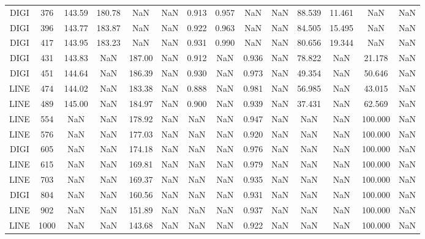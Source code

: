 \begin{table}[h]
\begin{tabular}{cccccccccccccc}
		\rowcolor[HTML]{EFEFEF} 
		DIGI & 376    & 143.59 & 180.78 & NaN    & NaN    & 0.913 & 0.957 & NaN   & NaN   & 88.539 & 11.461 & NaN     & NaN     \\
		DIGI & 396    & 143.77 & 183.87 & NaN    & NaN    & 0.922 & 0.963 & NaN   & NaN   & 84.505 & 15.495 & NaN     & NaN     \\
		\rowcolor[HTML]{EFEFEF} 
		DIGI & 417    & 143.95 & 183.23 & NaN    & NaN    & 0.931 & 0.990 & NaN   & NaN   & 80.656 & 19.344 & NaN     & NaN     \\
		DIGI & 431    & 143.83 & NaN    & 187.00 & NaN    & 0.912 & NaN   & 0.936 & NaN   & 78.822 & NaN    & 21.178  & NaN     \\
		\rowcolor[HTML]{EFEFEF} 
		DIGI & 451    & 144.64 & NaN    & 186.39 & NaN    & 0.930 & NaN   & 0.973 & NaN   & 49.354 & NaN    & 50.646  & NaN     \\
		LINE & 474    & 144.02 & NaN    & 183.38 & NaN    & 0.888 & NaN   & 0.981 & NaN   & 56.985 & NaN    & 43.015  & NaN     \\
		\rowcolor[HTML]{EFEFEF} 
		LINE & 489    & 145.00 & NaN    & 184.97 & NaN    & 0.900 & NaN   & 0.939 & NaN   & 37.431 & NaN    & 62.569  & NaN     \\
		LINE & 554    & NaN    & NaN    & 178.92 & NaN    & NaN   & NaN   & 0.947 & NaN   & NaN    & NaN    & 100.000 & NaN     \\
		\rowcolor[HTML]{EFEFEF} 
		LINE & 576    & NaN    & NaN    & 177.03 & NaN    & NaN   & NaN   & 0.920 & NaN   & NaN    & NaN    & 100.000 & NaN     \\
		DIGI & 605    & NaN    & NaN    & 174.18 & NaN    & NaN   & NaN   & 0.976 & NaN   & NaN    & NaN    & 100.000 & NaN     \\
		\rowcolor[HTML]{EFEFEF} 
		LINE & 615    & NaN    & NaN    & 169.81 & NaN    & NaN   & NaN   & 0.979 & NaN   & NaN    & NaN    & 100.000 & NaN     \\
		LINE & 703    & NaN    & NaN    & 169.37 & NaN    & NaN   & NaN   & 0.935 & NaN   & NaN    & NaN    & 100.000 & NaN     \\
		\rowcolor[HTML]{EFEFEF} 
		DIGI & 804    & NaN    & NaN    & 160.56 & NaN    & NaN   & NaN   & 0.931 & NaN   & NaN    & NaN    & 100.000 & NaN     \\
		LINE & 902    & NaN    & NaN    & 151.89 & NaN    & NaN   & NaN   & 0.937 & NaN   & NaN    & NaN    & 100.000 & NaN     \\
		\rowcolor[HTML]{EFEFEF} 
		LINE & 1000   & NaN    & NaN    & 143.68 & NaN    & NaN   & NaN   & 0.922 & NaN   & NaN    & NaN    & 100.000 & NaN     \\

\end{tabular}
\end{table}
